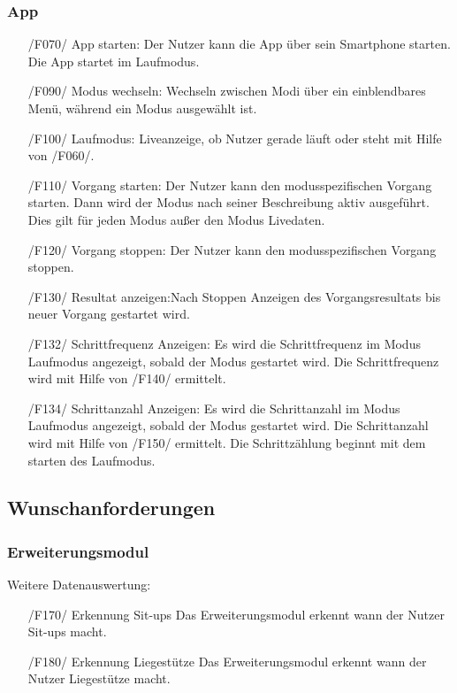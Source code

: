 \documentclass[a4paper,12pt]{article}
\begin{document}
    \subsubsection{App}
      \begin{itemize}
      \item[/F070/] \textsf{App starten:} Der Nutzer kann die App über sein Smartphone starten. Die App startet im Laufmodus.
      \item[/F090/] \textsf{Modus wechseln:} Wechseln zwischen Modi über ein einblendbares Menü, während ein Modus ausgewählt ist.
      \item[/F100/] \textsf{Laufmodus:} Liveanzeige, ob Nutzer gerade \glqq läuft\grqq{} oder \glqq steht\grqq{} mit Hilfe von /F060/.
      \item[/F110/] \textsf{Vorgang starten:} Der Nutzer kann den modusspezifischen \Gls{Vorgang} starten. Dann wird der Modus nach seiner Beschreibung aktiv ausgeführt. Dies gilt für jeden Modus außer den Modus \glqq Livedaten\grqq.
      \item[/F120/] \textsf{Vorgang stoppen:} Der Nutzer kann den modusspezifischen \Gls{Vorgang} stoppen.
      \item[/F130/] \textsf{Resultat anzeigen:}Nach Stoppen Anzeigen des Vorgangsresultats bis neuer \Gls{Vorgang} gestartet wird.
      \item[/F132/] \textsf {Schrittfrequenz Anzeigen:} Es wird die Schrittfrequenz im Modus \glqq{}Laufmodus\grqq{} angezeigt, sobald der Modus gestartet wird. Die Schrittfrequenz wird mit Hilfe von /F140/ ermittelt.%
      \item[/F134/] \textsf {Schrittanzahl Anzeigen:} Es wird die Schrittanzahl im Modus \glqq{}Laufmodus\grqq{} angezeigt, sobald der Modus gestartet wird. Die Schrittanzahl wird mit Hilfe von /F150/ ermittelt. Die Schrittzählung beginnt mit dem starten des Laufmodus.
    \end{itemize}
  \subsection{Wunschanforderungen}
    \subsubsection{Erweiterungsmodul}
      Weitere Datenauswertung:
      \begin{itemize}
      \item[/F170/] \textsf{Erkennung Sit-ups} Das Erweiterungsmodul erkennt wann der Nutzer Sit-ups macht.
      \item[/F180/] \textsf{Erkennung Liegestütze} Das Erweiterungsmodul erkennt wann der Nutzer Liegestütze macht.
      \end{itemize} 
\end{document}
